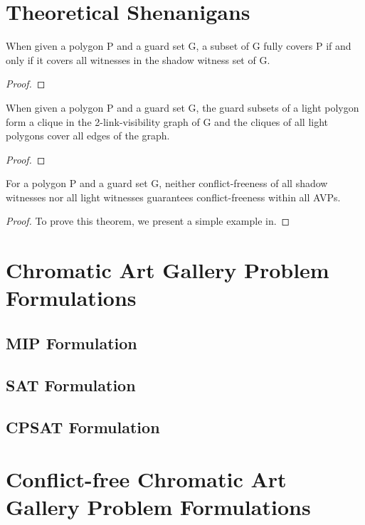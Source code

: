 \chapter{Theoretical Shenanigans}

\begin{theorem}
When given a polygon P and a guard set G, a subset of G fully covers P if and only if it covers all witnesses in the shadow witness set of G.
\end{theorem}
\begin{proof}

\end{proof}

\begin{theorem}
When given a polygon P and a guard set G, the guard subsets of a light polygon form a clique in the 2-link-visibility graph of G and the cliques of all light polygons cover all edges of the graph.
\end{theorem}
\begin{proof}
    
\end{proof}

\begin{theorem}
For a polygon P and a guard set G, neither conflict-freeness of all shadow witnesses nor all light witnesses guarantees conflict-freeness within all AVPs.
\end{theorem}
\begin{proof}
To prove this theorem, we present a simple example in.
\end{proof}

\chapter{Chromatic Art Gallery Problem Formulations}

\section{MIP Formulation}

\section{SAT Formulation}

\section{CPSAT Formulation}

\chapter{Conflict-free Chromatic Art Gallery Problem Formulations}

